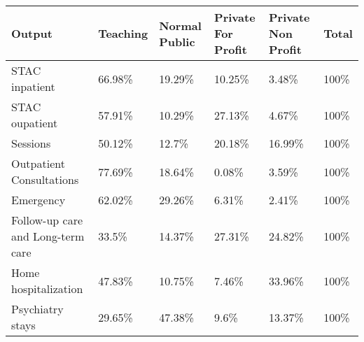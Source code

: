 \begin{tabular}{llllll}
  \toprule
Output & Teaching & Normal Public & Private For Profit & Private Non Profit & Total \\ 
  \midrule
STAC inpatient & 66.98\% & 19.29\% & 10.25\% & 3.48\% & 100\% \\ 
  STAC oupatient & 57.91\% & 10.29\% & 27.13\% & 4.67\% & 100\% \\ 
  Sessions & 50.12\% & 12.7\% & 20.18\% & 16.99\% & 100\% \\ 
  Outpatient Consultations & 77.69\% & 18.64\% & 0.08\% & 3.59\% & 100\% \\ 
  Emergency & 62.02\% & 29.26\% & 6.31\% & 2.41\% & 100\% \\ 
  Follow-up care and Long-term care & 33.5\% & 14.37\% & 27.31\% & 24.82\% & 100\% \\ 
  Home hospitalization & 47.83\% & 10.75\% & 7.46\% & 33.96\% & 100\% \\ 
  Psychiatry stays & 29.65\% & 47.38\% & 9.6\% & 13.37\% & 100\% \\ 
   \bottomrule
\end{tabular}
